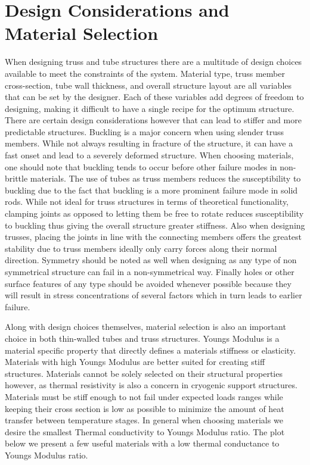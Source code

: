 \documentclass[final]{svjour2}
\begin{document}
\section{Design Considerations and Material Selection}
When designing truss and tube structures there are a multitude of design choices available to meet the constraints of the system.  Material type, truss member cross-section, tube wall thickness, and overall structure layout are all variables that can be set by the designer.  Each of these variables add degrees of freedom to designing, making it difficult to have a single recipe for the optimum structure.  There are certain design considerations however that can lead to stiffer and more predictable structures.  Buckling is a major concern when using slender truss members.  While not always resulting in fracture of the structure, it can have a fast onset and lead to a severely deformed structure.  When choosing materials, one should note that buckling tends to occur before other failure modes in non-brittle materials. The use of tubes as truss members reduces the susceptibility to buckling due to the fact that buckling is a more prominent failure mode in solid rods.  While not ideal for truss structures in terms of theoretical functionality, clamping joints as opposed to letting them be free to rotate reduces susceptibility to buckling thus giving the overall structure greater stiffness. Also when designing trusses, placing the joints in line with the connecting members offers the greatest stability due to truss members ideally only carry forces along their normal direction.  Symmetry should be noted as well when designing as any type of non symmetrical structure can fail in a non-symmetrical way.  Finally holes or other surface features of any type should be avoided whenever possible because they will result in stress concentrations of several factors which in turn leads to earlier failure.  

Along with design choices themselves, material selection is also an important  choice in both thin-walled tubes and truss structures. Youngs Modulus is a material specific property that directly defines a materials stiffness or elasticity.  Materials with high Youngs Modulus are better suited for creating stiff structures. Materials cannot be solely selected on their structural properties however, as thermal resistivity is also a concern in cryogenic support structures.  Materials must be stiff enough to not fail under expected loads ranges while keeping their cross section is low as possible to minimize the amount of heat transfer between temperature stages.  In general when choosing materials we desire the smallest Thermal conductivity to Youngs Modulus ratio.  The plot below we present a few useful materials with a low thermal conductance to Youngs Modulus ratio.
\end{document}
